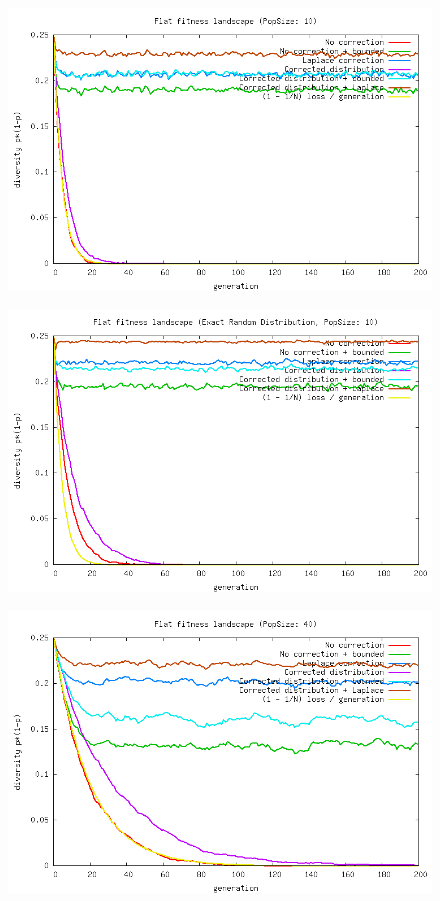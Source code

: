 \documentclass[a4paper,twoside]{report}
\begin{document}
\begin{figure}[htp]
\includegraphics[scale=0.5]{graph_haystack000_diversity.png}
\end{figure}
\begin{figure}[htp]
\includegraphics[scale=0.5]{graph_haystack001_diversity.png}
\end{figure}
\begin{figure}[htp]
\includegraphics[scale=0.5]{graph_haystack002_diversity.png}
\end{figure}
\end{document}
